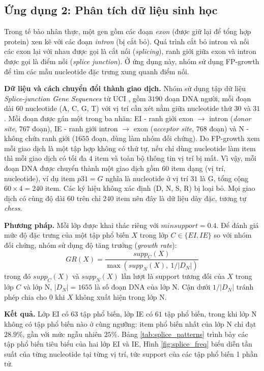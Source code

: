 \documentclass[conference]{IEEEtran}
\begin{document}
\subsection{Ứng dụng 2: Phân tích dữ liệu sinh học}
Trong tế bào nhân thực, một gen gồm các đoạn \textit{exon} (được giữ lại để tổng hợp protein) xen kẽ với các đoạn \textit{intron} (bị cắt bỏ). Quá trình cắt bỏ intron và nối các exon lại với nhau được gọi là cắt nối (\textit{splicing}), ranh giới giữa exon và intron được gọi là điểm nối (\textit{splice junction}). Ở ứng dụng này, nhóm sử dụng FP-growth để tìm các mẫu nucleotide đặc trưng xung quanh điểm nối.

\textbf{Dữ liệu và cách chuyển đổi thành giao dịch.} Nhóm sử dụng tập dữ liệu \textit{Splice-junction Gene Sequences} \cite{noordewier1991training} từ UCI \cite{uci1998repository}, gồm $3190$ đoạn DNA người, mỗi đoạn dài $60$ nucleotide (A, C, G, T) với vị trí cần xét nằm giữa nucleotide thứ $30$ và $31$. Mỗi đoạn được gán một trong ba nhãn: EI - ranh giới exon $\rightarrow$ intron (\textit{donor site}, $767$ đoạn), IE - ranh giới intron $\rightarrow$ exon (\textit{acceptor site}, $768$ đoạn) và N - không chứa ranh giới ($1655$ đoạn, dùng làm nhóm đối chứng). Do FP-growth xem mỗi giao dịch là một tập hợp không có thứ tự, nếu chỉ dùng nucleotide làm item thì mỗi giao dịch có tối đa $4$ item và toàn bộ thông tin vị trí bị mất. Vì vậy, mỗi đoạn DNA được chuyển thành một giao dịch gồm $60$ item dạng (vị trí, nucleotide), ví dụ item $p31{=}G$ nghĩa là nucleotide ở vị trí $31$ là G, tổng cộng $60 \times 4 = 240$ item. Các ký hiệu không xác định (D, N, S, R) bị loại bỏ. Mọi giao dịch có cùng độ dài $60$ trên chỉ $240$ item nên đây là dữ liệu dày đặc, tương tự \textit{chess}.

\textbf{Phương pháp.} Mỗi lớp được khai thác riêng với $minsupport = 0.4$. Để đánh giá mức độ đặc trưng của một tập phổ biến $X$ trong lớp $C \in \{EI, IE\}$ so với nhóm đối chứng, nhóm sử dụng độ tăng trưởng (\textit{growth rate}):
\begin{equation}
    GR(X) = \frac{supp_C(X)}{\max\left(supp_N(X),\ 1/|D_N|\right)}
    \label{eq:growth_rate}
\end{equation}
trong đó $supp_C(X)$ và $supp_N(X)$ lần lượt là support tương đối của $X$ trong lớp $C$ và lớp N, $|D_N| = 1655$ là số đoạn DNA của lớp N. Cận dưới $1/|D_N|$ tránh phép chia cho $0$ khi $X$ không xuất hiện trong lớp N.

\textbf{Kết quả.} Lớp EI có $63$ tập phổ biến, lớp IE có $61$ tập phổ biến, trong khi lớp N không có tập phổ biến nào ở cùng ngưỡng: item phổ biến nhất của lớp N chỉ đạt $28.9\%$, gần với mức ngẫu nhiên $25\%$. Bảng \ref{tab:splice_patterns} trình bày các tập phổ biến tiêu biểu của hai lớp EI và IE, Hình \ref{fig:splice_freq} biểu diễn tần suất của từng nucleotide tại từng vị trí, tức support của các tập phổ biến 1 phần tử.
\end{document}
